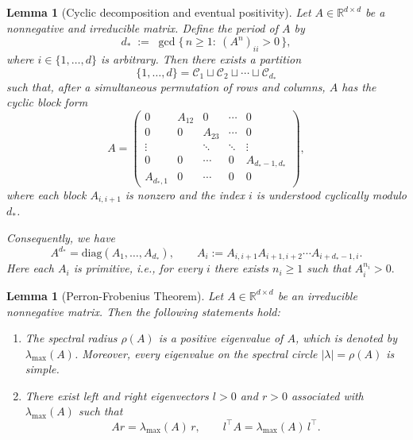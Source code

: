 \documentclass[11pt,twoside, a4paper]{article}
\numberwithin{equation}{section}
\numberwithin{figure}{section}
\theoremstyle{plain} %
\newtheorem{lemma}[theorem]{Lemma}
\theoremstyle{definition}
\theoremstyle{remark}
\newcommand{\1} {\mspace{1 mu}}
\newcommand{\2} {\mspace{2 mu}}
\begin{document}
\begin{lemma}[Cyclic decomposition and eventual positivity]\label{lem:cyclic-decomp}
Let $A\in\mathbb R^{d\times d}$ be a nonnegative and irreducible matrix. Define the \emph{period} of $A$ by
\begin{equation*}\label{eq:period-def}
d_* \;:=\; \gcd\bigl\{\, n\ge 1:\ (A^n)_{ii}>0\,\bigr\},
\end{equation*}
where $i\in\{1,\dots,d\}$ is arbitrary.
Then there exists a partition
\[
\{1,\dots,d\}=\mathcal C_1\sqcup\mathcal C_2\sqcup\cdots\sqcup\mathcal C_{d_*}
\]
such that, after a simultaneous permutation of rows and columns, $A$ has the cyclic block form
\begin{equation*}\label{eq:cyclic-form}
A=
\begin{pmatrix}
0 & A_{12} & 0 & \cdots & 0\\
0 & 0 & A_{23} & \cdots & 0\\
\vdots & & \ddots & \ddots & \vdots\\
0 & 0 & \cdots & 0 & A_{d_*-1,d_*}\\
A_{d_*,1} & 0 & \cdots & 0 & 0
\end{pmatrix},
\end{equation*}
where each block $A_{i,i+1}$ is nonzero and the index $i$ is understood cyclically modulo $d_*$.

Consequently, we have
\begin{equation*}\label{eq:Sd-block-diag}
A^{d_*}=\mathrm{diag}(A_1,\dots,A_{d_*}),
\qquad 
A_i:=A_{i,i+1}A_{i+1,i+2}\cdots A_{i+d_*-1,i}.
\end{equation*}
Here each $A_i$ is primitive, i.e., for every $i$ there exists $n_i\ge 1$ such that
$
A_i^{n_i}>0.
$
\end{lemma}


\begin{lemma}[Perron-Frobenius Theorem]\label{lem.PF}
Let \(A\in \mathbb{R}^{d\times d}\) be an irreducible nonnegative matrix. Then the following statements hold:
\begin{enumerate}
    \item The spectral radius \(\rho(A)\) is a positive eigenvalue of \(A\), which is denoted by $\lambda_{\max}(A)$.
    Moreover, every eigenvalue on the spectral circle \(|\lambda|=\rho(A)\) is simple.

    \item There exist left and right eigenvectors \(l>0\) and \(r>0\) associated with \(\lambda_{\max}(A)\) such that
    \[
    Ar=\lambda_{\max}(A)\,r,
    \qquad
    l^\top A=\lambda_{\max}(A)\,l^\top.
    \]
\end{enumerate}
\end{lemma}
\end{document}
